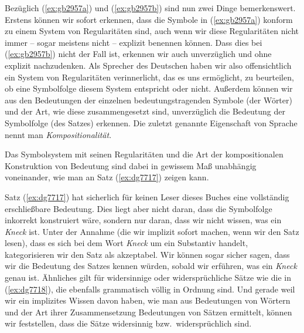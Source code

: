 \begin{exe}
  \ex
  \begin{xlist}
  \end{xlist}
\end{exe}


Bezüglich (\ref{ex:gb2957a}) und (\ref{ex:gb2957b}) sind nun zwei Dinge bemerkenswert.
Erstens können wir sofort erkennen, dass die Symbole in (\ref{ex:gb2957a}) konform zu einem System von Regularitäten sind, auch wenn wir diese Regularitäten nicht immer -- sogar meistens nicht -- explizit benennen können.
Dass dies bei (\ref{ex:gb2957b}) nicht der Fall ist, erkennen wir auch unverzüglich und ohne explizit nachzudenken.
Als Sprecher des Deutschen haben wir also offensichtlich ein System von Regularitäten verinnerlicht, das es uns ermöglicht, zu beurteilen, ob eine Symbolfolge diesem System entspricht oder nicht.
Außerdem können wir aus den Bedeutungen der einzelnen bedeutungstragenden Symbole (der Wörter) und der Art, wie diese zusammengesetzt sind, unverzüglich die Bedeutung der Symbolfolge (des Satzes) erkennen.
Die zuletzt genannte Eigenschaft von Sprache nennt man \textit{Kompositionalität}.


Das Symbolsystem mit seinen Regularitäten und die Art der kompositionalen Konstruktion von Bedeutung sind dabei in gewissem Maß unabhängig voneinander, wie man an Satz (\ref{ex:dg7717}) zeigen kann.

\begin{exe}
\end{exe}

Satz (\ref{ex:dg7717}) hat sicherlich für keinen Leser dieses Buches eine vollständig er\-schließ\-bare Bedeutung.
Dies liegt aber nicht daran, dass die Symbolfolge inkorrekt konstruiert wäre, sondern nur daran, dass wir nicht wissen, was ein \textit{Kneck} ist.
Unter der Annahme (die wir implizit sofort machen, wenn wir den Satz lesen), dass es sich bei dem Wort \textit{Kneck} um ein Substantiv handelt, kategorisieren wir den Satz als akzeptabel.
Wir können sogar sicher sagen, dass wir die Bedeutung des Satzes kennen würden, sobald wir erführen, was ein \textit{Kneck} genau ist.
Ähnliches gilt für widersinnige oder widersprüchliche Sätze wie die in (\ref{ex:dg7718}), die ebenfalls grammatisch völlig in Ordnung sind.
Und gerade weil wir ein implizites Wissen davon haben, wie man aus Bedeutungen von Wörtern und der Art ihrer Zusammensetzung Bedeutungen von Sätzen ermittelt, können wir feststellen, dass die Sätze widersinnig bzw.\ widersprüchlich sind.

